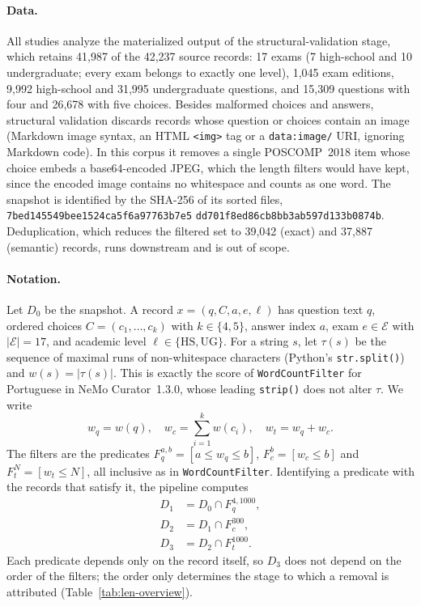 \paragraph{Data.} All studies analyze the materialized output of the
structural-validation stage, which retains 41,987 of the 42,237 source
records: 17 exams (7 high-school and 10 undergraduate; every exam belongs to
exactly one level), 1,045 exam editions, 9,992 high-school and 31,995
undergraduate questions, and 15,309 questions with four and 26,678 with five
choices. Besides malformed choices and answers, structural validation
discards records whose question or choices contain an image (Markdown image
syntax, an HTML \texttt{<img>} tag or a \texttt{data:image/} URI, ignoring
Markdown code). In this corpus it removes a single POSCOMP~2018 item whose
choice embeds a base64-encoded JPEG, which the length filters would have
kept, since the encoded image contains no whitespace and counts as one word.
The snapshot is identified by the SHA-256 of its sorted files,
\texttt{7bed145549bee1524ca5f6a97763b7e5}\allowbreak
\texttt{dd701f8ed86cb8bb3ab597d133b0874b}. Deduplication, which reduces the
filtered set to 39,042 (exact) and 37,887 (semantic) records, runs downstream
and is out of scope.

\paragraph{Notation.} Let $D_0$ be the snapshot. A record
$x=(q,C,a,e,\ell)$ has question text $q$, ordered choices
$C=(c_1,\dots,c_k)$ with $k\in\{4,5\}$, answer index $a$, exam
$e\in\mathcal{E}$ with $|\mathcal{E}|=17$, and academic level
$\ell\in\{\mathrm{HS},\mathrm{UG}\}$. For a string $s$, let $\tau(s)$ be the
sequence of maximal runs of non-whitespace characters (Python's
\texttt{str.split()}) and $w(s)=|\tau(s)|$. This is exactly the score of
\texttt{WordCountFilter} for Portuguese in NeMo Curator~1.3.0, whose leading
\texttt{strip()} does not alter $\tau$. We write
\begin{equation*}
w_q = w(q),\quad w_c = \textstyle\sum_{i=1}^{k} w(c_i),\quad w_t = w_q + w_c .
\end{equation*}
The filters are the predicates $F_q^{a,b} = [a \le w_q \le b]$,
$F_c^{b} = [w_c \le b]$ and $F_t^{N} = [w_t \le N]$, all inclusive as in
\texttt{WordCountFilter}. Identifying a predicate with the records that
satisfy it, the pipeline computes
\begin{align*}
D_1 &= D_0 \cap F_q^{4,1000},\\
D_2 &= D_1 \cap F_c^{300},\\
D_3 &= D_2 \cap F_t^{1000}.
\end{align*}
Each predicate depends only on the record itself, so $D_3$ does not depend on
the order of the filters; the order only determines the stage to which a
removal is attributed (Table~\ref{tab:len-overview}).

